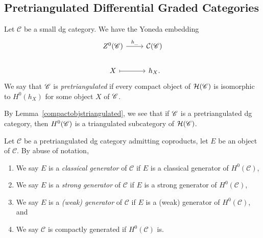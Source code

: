 \documentclass[dissertation.tex]{subfiles}
\begin{document}
\subsection{Pretriangulated Differential Graded Categories}

\begin{defn}
  Let $\mathscr{C}$ be a small dg category.
  We have the Yoneda embedding 
  $$\begin{tikzcd}
    Z^0(\mathscr{C}) \arrow{r}{h_{\_}} & \mathcal{C}(\mathscr{C})\\
    X \arrow[mapsto]{r} & h_X.
  \end{tikzcd}$$
  We say that $\mathscr{C}$ is {\it pretriangulated} if every compact object of $\mathcal{H}(\mathscr{C})$ is isomorphic to $H^0(h_X)$ for some object $X$ of $\mathscr{C}$.
\end{defn}

\begin{rmk}
  By Lemma~\ref{compactobjstriangulated}, we see that if $\mathscr{C}$ is a pretriangulated dg category, then $H^0(\mathscr{C})$ is a triangulated subcategory of $\mathcal{H}(\mathscr{C})$.
\end{rmk}

\begin{defn}
  Let $\mathscr{C}$ be a pretriangulated dg category admitting coproducts, let $E$ be an object of $\mathscr{C}$.
  By abuse of notation, 
  \begin{enumerate}
  \item
    We say $E$ is a {\it classical generator} of $\mathscr{C}$ if $E$ is a classical generator of $H^0(\mathscr{C})$,
  \item
    We say $E$ is a {\it strong generator} of $\mathscr{C}$ if $E$ is a strong generator of $H^0(\mathscr{C})$,
  \item
    We say $E$ is a {\it (weak) generator} of $\mathscr{C}$ if $E$ is a (weak) generator of $H^0(\mathscr{C})$, and
  \item
    We say $\mathscr{C}$ is compactly generated if $H^0(\mathscr{C})$ is.
  \end{enumerate}
\end{defn}

\end{document}
